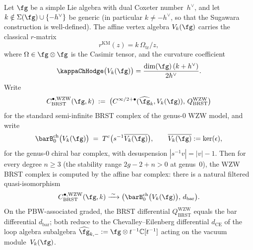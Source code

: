 \begin{proposition}
\label{prop:wzw-brst-bar-genus0}
Let $\fg$ be a simple Lie algebra with dual Coxeter number~$h^\vee$,
and let $k \notin \Sigma(\fg) \cup \{-h^\vee\}$ be generic
\textup{(}in particular $k \neq -h^\vee$, so that the Sugawara
construction is well-defined\textup{)}. The affine vertex algebra
$V_k(\fg)$ carries the classical $r$-matrix
\begin{equation}\label{eq:wzw-r-matrix-brst}
r^{\mathrm{KM}}(z) = k\,\Omega_{\mathrm{tr}}/z,
\end{equation}
where $\Omega \in \fg \otimes \fg$ is the Casimir tensor, and the
curvature coefficient
\begin{equation}\label{eq:wzw-kappa-brst}
\kappaChHodge\bigl(V_k(\fg)\bigr)
= \frac{\dim(\fg)\,(k + h^\vee)}{2h^\vee}.
\end{equation}
Write
\[
 C_{\mathrm{BRST}}^{\bullet,\mathrm{WZW}}(\fg,k)
 \;:=\;
 \bigl(
 C^{\infty/2+\bullet}(\widehat{\fg}_k, V_k(\fg)),\,
 Q_{\mathrm{BRST}}^{\mathrm{WZW}}
 \bigr)
\]
for the standard semi-infinite BRST complex of the genus-$0$ WZW
model, and write
\[
 \barB^{\mathrm{ch}}_0\bigl(V_k(\fg)\bigr)
 \;=\;
 T^c\bigl(s^{-1}\overline{V_k(\fg)}\bigr),
 \qquad
 \overline{V_k(\fg)} := \ker(\epsilon),
\]
for the genus-$0$ chiral bar complex, with desuspension
$|s^{-1}v| = |v| - 1$. Then for every degree $n \geq 3$
\textup{(}the stability range $2g - 2 + n > 0$ at genus~$0$\textup{)},
the WZW BRST complex is computed by the affine bar complex: there
is a natural filtered quasi-isomorphism
\begin{equation}\label{eq:wzw-brst-bar-qi}
 C_{\mathrm{BRST}}^{\bullet,\mathrm{WZW}}(\fg,k)
 \xrightarrow{\;\sim\;}
 \bigl(
 \barB^{\mathrm{ch}}_0\bigl(V_k(\fg)\bigr),\,
 d_{\mathrm{bar}}
 \bigr).
\end{equation}
On the PBW-associated graded, the BRST differential
$Q_{\mathrm{BRST}}^{\mathrm{WZW}}$ equals the bar differential
$d_{\mathrm{bar}}$; both reduce to the Chevalley--Eilenberg
differential $d_{\mathrm{CE}}$ of the loop algebra subalgebra
$\widehat{\fg}_{k,-} := \fg \otimes t^{-1}\mathbb{C}[t^{-1}]$
acting on the vacuum module~$V_k(\fg)$.
\end{proposition}

